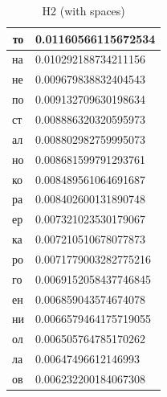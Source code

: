 \begin{table}[]
\centering
\caption{H2 (with spaces)}
\label{tab:my-table}
\begin{tabular}{ll}
\hline
\multicolumn{1}{|c|}{\textbf{то}} & \multicolumn{1}{c|}{\textbf{0.01160566115672534}} \\ \hline
\multicolumn{1}{|l|}{на}          & \multicolumn{1}{l|}{0.010292188734211156}         \\ \hline
\multicolumn{1}{|l|}{не}          & \multicolumn{1}{l|}{0.009679838832404543}         \\ \hline
\multicolumn{1}{|l|}{по}          & \multicolumn{1}{l|}{0.009132709630198634}         \\ \hline
\multicolumn{1}{|l|}{ст}          & \multicolumn{1}{l|}{0.008886320320595973}         \\ \hline
\multicolumn{1}{|l|}{ал}          & \multicolumn{1}{l|}{0.008802982759995073}         \\ \hline
\multicolumn{1}{|l|}{но}          & \multicolumn{1}{l|}{0.008681599791293761}         \\ \hline
\multicolumn{1}{|l|}{ко}          & \multicolumn{1}{l|}{0.008489561064691687}         \\ \hline
\multicolumn{1}{|l|}{ра}          & \multicolumn{1}{l|}{0.008402600131890748}         \\ \hline
\multicolumn{1}{|l|}{ер}          & \multicolumn{1}{l|}{0.007321023530179067}         \\ \hline
\multicolumn{1}{|l|}{ка}          & \multicolumn{1}{l|}{0.007210510678077873}         \\ \hline
\multicolumn{1}{|l|}{ро}          & \multicolumn{1}{l|}{0.0071779003282775216}        \\ \hline
\multicolumn{1}{|l|}{го}          & \multicolumn{1}{l|}{0.0069152058437746845}        \\ \hline
\multicolumn{1}{|l|}{ен}          & \multicolumn{1}{l|}{0.006859043574674078}         \\ \hline
\multicolumn{1}{|l|}{ни}          & \multicolumn{1}{l|}{0.0066579464175719055}        \\ \hline
\multicolumn{1}{|l|}{ол}          & \multicolumn{1}{l|}{0.006505764785170262}         \\ \hline
\multicolumn{1}{|l|}{ла}          & \multicolumn{1}{l|}{0.00647496612146993}          \\ \hline
\multicolumn{1}{|l|}{ов}          & \multicolumn{1}{l|}{0.006232200184067308}         \\ \hline

\end{tabular}
\end{table}
